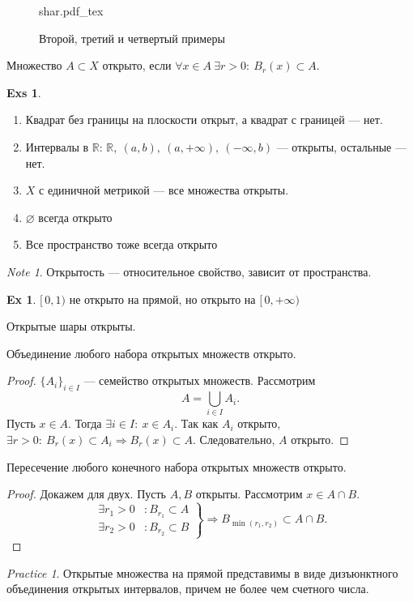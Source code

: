 \documentclass[11pt]{book}
\newcommand{\incfig}[1]{%
    \def\svgwidth{\columnwidth}
    {#1.pdf_tex}
}
\newcommand{\R}{\mathbb{R}}
\theoremstyle{definition}
\theoremstyle{plain}
\theoremstyle{plain}
\theoremstyle{definition}
\newtheorem*{ex}{Ex}
\newtheorem*{exs}{Exs}
\theoremstyle{remark}
\newtheorem*{note}{Note}
\newtheorem*{prac}{Practice}
\begin{document}
\begin{figure}[ht]
    \centering
    \incfig{shar}
    \caption{Второй, третий и четвертый примеры}
    \label{fig:shar}
\end{figure}
\begin{defn}
    Множество  $ A \subset X$ открыто, если $ \forall x \in A ~ \exists  r>0: ~ B_r(x) \subset A$.
\end{defn}
\begin{exs}
    $ $
    \begin{enumerate}
	\item Квадрат без границы на плоскости открыт, а квадрат с границей --- нет.
	\item Интервалы в $ \R$:  $ \R, ~(a, b), ~(a, +\infty), ~ (-\infty, b)$ --- открыты, остальные --- нет.
	\item $ X$ с единичной метрикой --- все множества открыты.
	\item  $ \varnothing$  всегда открыто
	\item Все пространство тоже всегда открыто
    \end{enumerate}
\end{exs}
\begin{note}
    Открытость --- относительное свойство, зависит от пространства.
    \begin{ex}
	$ [\,0, 1)$ не открыто на прямой, но открыто на  $ [\,0, +\infty)$
    \end{ex}
\end{note}
\begin{thm}
    Открытые шары открыты.
\end{thm}
\begin{thm}
    Объединение любого набора открытых множеств открыто.
\end{thm}
\begin{proof}
    $ \{A_i\}_{i \in I}$ --- семейство открытых множеств. Рассмотрим
    \[
	A = \bigcup_{i \in  I} A_i
    .\]
    Пусть $ x \in A$. Тогда $ \exists  i \in I: ~ x \in A_i$. Так как $ A_i$ открыто,  $ \exists r >0: ~ B_r(x) \subset A_i \Longrightarrow B_r(x) \subset A$. Следовательно, $ A$ открыто.
\end{proof}
\begin{thm}
    Пересечение любого конечного набора открытых множеств открыто.
\end{thm}
\begin{proof}
    Докажем для двух. Пусть $ A, B$ открыты.
    Рассмотрим  $ x \in A\cap B$.
    \[
	\left.
	    \begin{aligned}
		\exists r_1>0 &: B_{r_1} \subset A \\
		\exists r_2>0 &: B_{r_2} \subset B
	    \end{aligned}
	\right \} \Longrightarrow B_{\min(r_1, r_2)} \subset  A\cap B
    .\]
\end{proof}
\begin{prac}
    Открытые множества на прямой представимы в виде дизъюнктного объединения открытых интервалов, причем не более чем счетного числа.
\end{prac}
\clearpage
\end{document}
